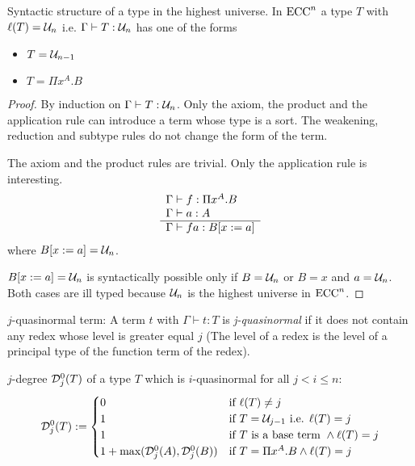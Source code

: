 \begin{lemma}
  Syntactic structure of a type in the highest universe.
  In $\text{ECC}^n$ a type $T$ with $\ell(T) = {\cal U}_n$ i.e. $\Gamma \vdash T :
  {\cal U}_n$ has one of the forms
  \begin{itemize}
  \item $T = {\cal U}_{n-1}$

  \item $T = \Pi x^A.B$
  \end{itemize}
  \begin{proof}
    By induction on $\Gamma \vdash T: {\cal U}_n$. Only the axiom, the product and
    the application rule can introduce a term whose type is a sort. The
    weakening, reduction and subtype rules do not change the form of the term.

    The axiom and the product rules are trivial. Only the application rule is
    interesting.
    $$
    \rulev
    {
      \Gamma \vdash f : \Pi x^A . B
      \\
      \Gamma \vdash a : A

    }
    {\Gamma \vdash f a : B [x:=a]}
    $$
    where $B [x:=a] = \uni_n$.

    $B [x:=a] = {\cal U}_n$ is syntactically possible only if $B = {\cal U}_n$ or $B =
    x$ and $a = {\cal U}_n$. Both cases are ill typed because
    ${\cal U}_n$ is the highest universe in $\text{ECC}^n$.

  \end{proof}
\end{lemma}



\begin{definition}
  $j$-quasinormal term:
  A term $t$ with $\Gamma \vdash t : T$ is \emph{j-quasinormal} if it does not
  contain any redex whose level is greater equal $j$ (The level of a redex is
  the level of a principal type of the function term of the redex).
\end{definition}

\begin{definition}
  $j$-degree ${\cal D}^0_j(T)$  of a type $T$ which is $i$-quasinormal for all
  $j < i \le n$:
  $$
  {\cal D}^0_j(T) :=
  \begin{cases}
    0 & \text{if } \ell(T) \not= j
    \\
    1 & \text{if } T = {\cal U}_{j-1} \text{ i.e. } \ell(T) = j
    \\
    1 & \text{if $T$ is a base term } \land \ell(T) = j
    \\
    1 + \text{max}({\cal D}^0_j(A), {\cal D}^0_j(B)) &
    \text{if } T = \Pi x^A.B \land \ell(T) = j
  \end{cases}
  $$
\end{definition}



